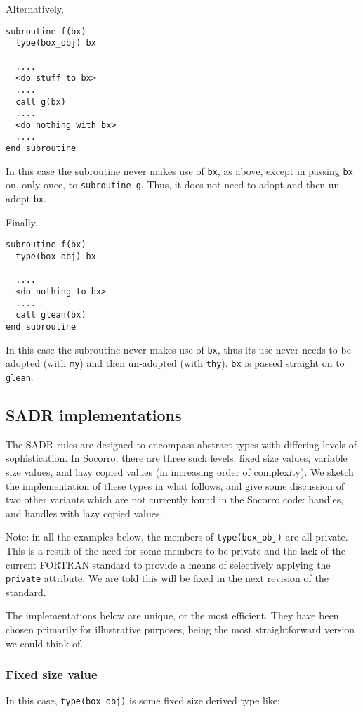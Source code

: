 Alternatively,
\begin{verbatim}
subroutine f(bx)
  type(box_obj) bx

  ....
  <do stuff to bx>
  ....
  call g(bx)
  ....
  <do nothing with bx>
  ....
end subroutine
\end{verbatim}
In this case the subroutine never makes use of \verb+bx+, as above,
except in passing \verb+bx+ on, only once, to \verb+subroutine g+.
Thus, it does not need to adopt and then un-adopt \verb+bx+.

Finally,
\begin{verbatim}
subroutine f(bx)
  type(box_obj) bx

  ....
  <do nothing to bx>
  ....
  call glean(bx)
end subroutine
\end{verbatim}
In this case the subroutine never makes use of \verb+bx+, thus
its use never needs to be adopted (with \verb+my+) and then
un-adopted (with \verb+thy+).  \verb+bx+ is passed straight on
to \verb+glean+.

\subsection{SADR implementations}

The SADR rules are designed to encompass abstract types with differing
levels of sophistication.  In Socorro, there are three such levels:
fixed size values, variable size values, and lazy copied values (in
increasing order of complexity).  We sketch the implementation of
these types in what follows, and give some discussion of two other
variants which are not currently found in the Socorro code: handles,
and handles with lazy copied values.

Note: in all the examples below, the members of \verb+type(box_obj)+
are all private.  This is a result of the need for some members to
be private and the lack of the current FORTRAN standard to provide
a means of selectively applying the \verb+private+ attribute.
We are told this will be fixed in the next revision of the standard.

The implementations below are unique, or the most efficient.  They
have been chosen primarily for illustrative purposes, being the most
straightforward version we could think of.

\subsubsection{Fixed size value}

In this case, \verb+type(box_obj)+ is some fixed size derived type
like:

